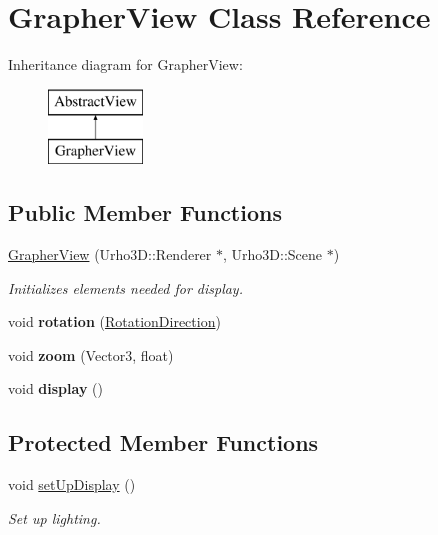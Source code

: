 \hypertarget{class_grapher_view}{}\section{Grapher\+View Class Reference}
\label{class_grapher_view}
Inheritance diagram for Grapher\+View\+:\begin{figure}[H]
\begin{center}
\leavevmode
\includegraphics[height=2.000000cm]{class_grapher_view}
\end{center}
\end{figure}
\subsection*{Public Member Functions}
\begin{DoxyCompactItemize}
\item 
\mbox{\label{class_grapher_view_acd60e89ec323abd8dfac6d05faaa52df}} 
\mbox{\hyperlink{class_grapher_view_acd60e89ec323abd8dfac6d05faaa52df}{Grapher\+View}} (Urho3\+D\+::\+Renderer $\ast$, Urho3\+D\+::\+Scene $\ast$)
\begin{DoxyCompactList}\small\item\em Initializes elements needed for display. \end{DoxyCompactList}\item 
\mbox{\label{class_grapher_view_a3f4f243bcb526a9e4ad603be511a7dba}} 
void {\bfseries rotation} (\mbox{\hyperlink{class_rotation_direction}{Rotation\+Direction}})
\item 
\mbox{\label{class_grapher_view_acb899745d37f0750093f16ea029f72ca}} 
void {\bfseries zoom} (Vector3, float)
\item 
\mbox{\label{class_grapher_view_acb39a173354be899481a1e9afc67ee0b}} 
void {\bfseries display} ()
\end{DoxyCompactItemize}
\subsection*{Protected Member Functions}
\begin{DoxyCompactItemize}
\item 
\mbox{\label{class_grapher_view_ad0182f6065479f304a4c7932fe0f65b0}} 
void \mbox{\hyperlink{class_grapher_view_ad0182f6065479f304a4c7932fe0f65b0}{set\+Up\+Display}} ()
\begin{DoxyCompactList}\small\item\em Set up lighting. \end{DoxyCompactList}\end{DoxyCompactItemize}


